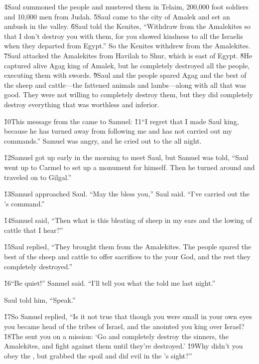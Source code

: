 \v{4}Saul summoned the people and mustered them in Telaim, 200,000 foot soldiers and 10,000 men from Judah. \v{5}Saul came to the city of Amalek and set an ambush in the valley. \v{6}Saul told the Kenites, ``Withdraw from the Amalekites so that I don't destroy you with them, for you showed kindness to all the Israelis when they departed from Egypt.'' So the Kenites withdrew from the Amalekites. \v{7}Saul attacked the Amalekites from Havilah to Shur, which is east of Egypt. \v{8}He captured alive Agag king of Amalek, but he completely destroyed all the people, executing them with swords. \v{9}Saul and the people spared Agag and the best of the sheep and cattle---the fattened animals and lambs---along with all that was good. They were not willing to completely destroy them, but they did completely destroy everything that was worthless and inferior.

\v{10}This message from the  came to Samuel: \v{11}``I regret that I made Saul king, because he has turned away from following me and has not carried out my commands.'' Samuel was angry, and he cried out to the  all night.

\v{12}Samuel got up early in the morning to meet Saul, but Samuel was told, ``Saul went up to Carmel to set up a monument for himself. Then he turned around and traveled on to Gilgal.''

\v{13}Samuel approached Saul. ``May the  bless you,'' Saul said. ``I've carried out the 's command.''

\v{14}Samuel said, ``Then what is this bleating of sheep in my ears and the lowing of cattle that I hear?''

\v{15}Saul replied, ``They brought them from the Amalekites. The people spared the best of the sheep and cattle to offer sacrifices to the  your God, and the rest they completely destroyed.''

\v{16}``Be quiet!'' Samuel said. ``I'll tell you what the  told me last night.''

Saul told him, ``Speak.''

\v{17}So Samuel replied, ``Is it not true that though you were small in your own eyes you became head of the tribes of Israel, and the  anointed you king over Israel? \v{18}The  sent you on a mission: `Go and completely destroy the sinners, the Amalekites, and fight against them until they're destroyed.' \v{19}Why didn't you obey the , but grabbed the spoil and did evil in the 's sight?''

